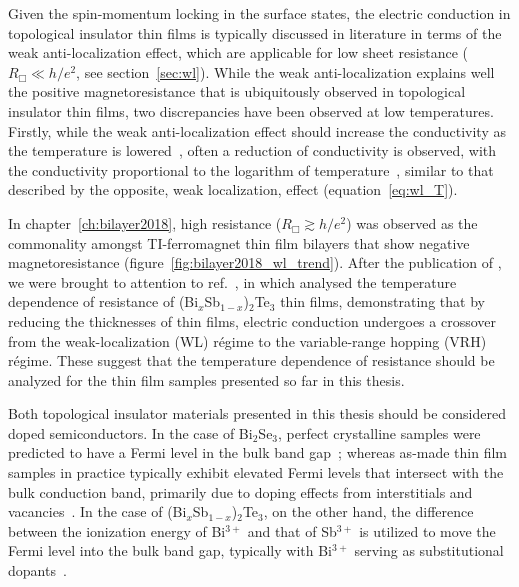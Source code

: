 Given the spin-momentum locking in the surface states, the electric conduction in topological insulator thin films is typically discussed in literature in terms of the weak anti-localization effect, which are applicable for low sheet resistance ($R_\Box \ll h/e^2$, see section~\ref{sec:wl}). While the weak anti-localization explains well the positive magnetoresistance that is ubiquitously observed in topological insulator thin films, two discrepancies have been observed at low temperatures. Firstly, while the weak anti-localization effect should increase the conductivity as the temperature is lowered~\cite{bergmann1984}, often a reduction of conductivity is observed, with the conductivity proportional to the logarithm of temperature~\cite{Chen2011, Liu2011, Roy2013}, similar to that described by the opposite, weak localization, effect (equation~\ref{eq:wl_T}).

In chapter~\ref{ch:bilayer2018}, high resistance ($R_\Box \gtrsim h/e^2$) was observed as the commonality amongst TI-ferromagnet thin film bilayers that show negative magnetoresistance (figure~\ref{fig:bilayer2018_wl_trend}). After the publication of \cite{bilayer2018}, we were brought to attention to ref.~\cite{liao2015}, in which \citeauthor{liao2015} analysed the temperature dependence of resistance of (Bi$_x$Sb$_{1-x}$)$_2$Te$_3$ thin films, demonstrating that by reducing the thicknesses of thin films, electric conduction undergoes a crossover from the weak-localization (WL) r\'egime to the variable-range hopping (VRH) r\'egime. These suggest that the temperature dependence of resistance should be analyzed for the thin film samples presented so far in this thesis.

Both topological insulator materials presented in this thesis should be considered doped semiconductors. In the case of Bi$_2$Se$_3$, perfect crystalline samples were predicted to have a Fermi level in the bulk band gap~\cite{TI_electronic_structure_zhang}; whereas as-made thin film samples in practice typically exhibit elevated Fermi levels that intersect with the bulk conduction band, primarily due to doping effects from interstitials and vacancies~\cite{TI_ARPES1, ARPES_thickness, zhangli2013, Zhanybek3, Fisher2010}. In the case of (Bi$_x$Sb$_{1-x}$)$_2$Te$_3$, on the other hand, the difference between the ionization energy of Bi$^{3+}$ and that of Sb$^{3+}$ is utilized to move the Fermi level into the bulk band gap, typically with Bi$^{3+}$ serving as substitutional dopants~\cite{ZhangJS2011, TI_electronic_structure_zhang}.

